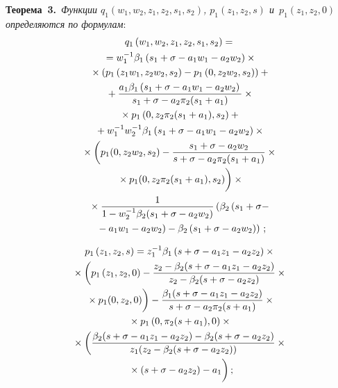 \begin{multicols}{2}
\noindent
\textbf{Теорема~3.}\ 
\textit{Функции $q_1\left(w_1,w_2,z_1,z_2,s_1,s_2\right)$, 
$p_1\left(z_1,z_2,s\right)$ и~$p_1\left(z_1,z_2,0\right)$  определяются по формулам}:
\begin{multline}
\label{n9}
q_1\left(w_1,w_2,z_1,z_2,s_1,s_2\right)={}\\
{}=
w_1^{-1}\beta_1\left(s_1+\sigma-a_1w_1-a_2w_2\right)\times{}\\
{}\times
\left(p_1\left(z_1w_1,z_2w_2,s_2\right)-
p_1\left(0,z_2w_2,s_2\right)\right)+{}\\
{}+\fr{a_1\beta_1\left(s_1+\sigma-a_1w_1-a_2w_2\right)}{s_1+\sigma-a_2\pi_2(s_1+a_1)}
\times{}\\
{}\times p_1\left(0,z_2\pi_2(s_1+a_1),s_2\right)+{}\\
{}+
w_1^{-1}w_2^{-1}\beta_1\left(s_1+\sigma-a_1w_1-a_2w_2\right)\times{}\\
{}\times
\left(p_1(0,z_2w_2,s_2)-\fr{s_1+\sigma-a_2w_2}
{s+\sigma-a_2\pi_2(s_1+a_1)}\times{}\right.\\
\left.{}\times p_1(0,z_2\pi_2(s_1+a_1),s_2)
\vphantom{\fr{1-\beta_2(s)}{1-\beta_2(s+a_1)}}
\right)
\times{}\\
{}\times
\fr{1}{1-w_2^{-1}\beta_2(s_1+\sigma-a_2w_2)}
\left( \beta_2\left(s_1+\sigma-\right.\right.\\
\left.\left.{}-a_1w_1-a_2w_2\right)-
\beta_2\left(s_1+\sigma-a_2w_2\right)\right)\,;
\end{multline}


\noindent
\begin{multline}
\label{n10}
p_1\left(z_1,z_2,s\right)=
z_1^{-1}\beta_1\left(s+\sigma-a_1z_1-a_2z_2\right)\times{}\\
{}\times \left(p_1\left(z_1,z_2,0\right)-
\fr{z_2-\beta_2(s+\sigma-a_1z_1-a_2z_2)}{z_2-\beta_2(s+\sigma-a_2z_2)}\times{}\right.\\
\left.{}\times
p_1(0,z_2,0)
\vphantom{\fr{z_2-\beta_2(s+\sigma-a_1z_1-a_2z_2)}{z_2-\beta_2(s+\sigma-a_2z_2)}}
\right)-
\fr{\beta_1(s+\sigma-a_1z_1-a_2z_2)}{s+\sigma-a_2\pi_2(s+a_1)}
\times{}\\
{}\times p_1\left(0,\pi_2(s+a_1),0\right)\times{}\\
{}\times\left(\fr{\beta_2(s+\sigma-a_1z_1-a_2z_2)-\beta_2(s+\sigma-a_2z_2)}
{z_1(z_2-\beta_2(s+\sigma-a_2z_2))}\times{}\right.\\
\left.{}\times \left(s+\sigma-a_2z_2\right)-a_1
\vphantom{\fr{z_2-\beta_2(s+\sigma-a_1z_1-a_2z_2)}{z_2-\beta_2(s+\sigma-a_2z_2)}}
\right);
\end{multline}


\end{multicols}
